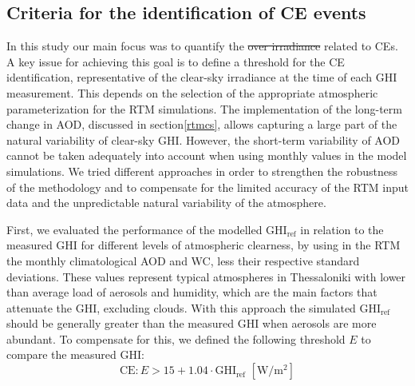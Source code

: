 \documentclass[preprint, 5p,
authoryear]{elsarticle} %
\providecommand{\DIFaddtex}[1]{{\protect\color{blue}\uwave{#1}}} %
\providecommand{\DIFdeltex}[1]{{\protect\color{red}\sout{#1}}}                      %
\providecommand{\DIFaddbegin}{} %
\providecommand{\DIFaddend}{} %
\providecommand{\DIFdelbegin}{} %
\providecommand{\DIFdelend}{} %
\providecommand{\DIFadd}[1]{\texorpdfstring{\DIFaddtex{#1}}{#1}} %
\providecommand{\DIFdel}[1]{\texorpdfstring{\DIFdeltex{#1}}{}} %
\newcommand{\DIFscaledelfig}{0.5}
\newlength{\DIFdelgraphicswidth} %
\newlength{\DIFdelgraphicsheight} %
\newcommand{\DIFaddincludegraphics}[2][]{{\color{blue}\fbox{\DIFOincludegraphics[#1]{#2}}}} %
\newcommand{\DIFdelincludegraphics}[2][]{%
\sbox{\DIFdelgraphicsbox}{\DIFOincludegraphics[#1]{#2}}%
\settoboxwidth{\DIFdelgraphicswidth}{\DIFdelgraphicsbox} %
\settoboxtotalheight{\DIFdelgraphicsheight}{\DIFdelgraphicsbox} %
\scalebox{\DIFscaledelfig}{%
\parbox[b]{\DIFdelgraphicswidth}{\usebox{\DIFdelgraphicsbox}\\[-\baselineskip] \rule{\DIFdelgraphicswidth}{0em}}\llap{\resizebox{\DIFdelgraphicswidth}{\DIFdelgraphicsheight}{%
\setlength{\unitlength}{\DIFdelgraphicswidth}%
\begin{picture}(1,1)%
\thicklines\linethickness{2pt} %
{\color[rgb]{1,0,0}\put(0,0){\framebox(1,1){}}}%
{\color[rgb]{1,0,0}\put(0,0){\line( 1,1){1}}}%
{\color[rgb]{1,0,0}\put(0,1){\line(1,-1){1}}}%
\end{picture}%
}\hspace*{3pt}}} %
} %
\DeclareRobustCommand{\DIFaddbegin}{\DIFOaddbegin \let\includegraphics\DIFaddincludegraphics} %
\DeclareRobustCommand{\DIFaddend}{\DIFOaddend \let\includegraphics\DIFOincludegraphics} %
\DeclareRobustCommand{\DIFdelbegin}{\DIFOdelbegin \let\includegraphics\DIFdelincludegraphics} %
\DeclareRobustCommand{\DIFdelend}{\DIFOaddend \let\includegraphics\DIFOincludegraphics} %
\begin{document}
\hypertarget{criteria-for-the-identification-of-ce-events}{%
\subsection{Criteria for the identification of CE
events}\label{criteria-for-the-identification-of-ce-events}}

In this study our main focus was to quantify the \DIFdelbegin \DIFdel{over irradiance }\DIFdelend \DIFaddbegin \DIFadd{OI }\DIFaddend related to CEs. A
key issue for achieving this goal is to define a threshold for the CE
identification, representative of the clear-sky irradiance at the time
of each GHI measurement. This depends on the selection of the
appropriate atmospheric parameterization for the RTM simulations. The
implementation of the long-term change in AOD, discussed in
section\nobreakspace{}\ref{rtmcs}, allows capturing a large part of the
natural variability of clear-sky GHI. However, the short-term
variability of AOD cannot be taken adequately into account when using
monthly values in the model simulations. We tried different approaches
in order to strengthen the robustness of the methodology and to
compensate for the limited accuracy of the RTM input data and the
unpredictable natural variability of the atmosphere.

First, we evaluated the performance of the modelled
\(\text{GHI}_\text{ref}\) in relation to the measured GHI for different
levels of atmospheric clearness, by using in the RTM the monthly
climatological AOD and WC, less their respective standard deviations.
These values represent typical atmospheres in Thessaloniki with lower
than average load of aerosols and humidity, which are the main factors
that attenuate the GHI, excluding clouds. With this approach the
simulated \(\text{GHI}_\text{ref}\) should be generally greater than the
measured GHI when aerosols are more abundant. To compensate for this, we
defined the following threshold \(E\) to compare the measured
\(\text{GHI}\): \begin{equation}
\text{CE} : E > 15 + 1.04 \cdot \text{GHI}_\text{ref} \,\,[\text{W}/\text{m}^2] \label{eq:CE4}
\end{equation}
\end{document}
